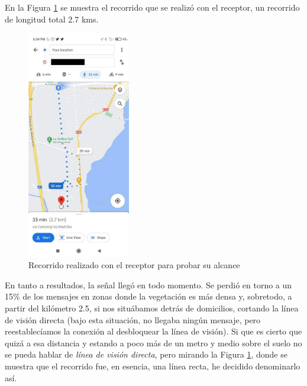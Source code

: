 \documentclass[12pt]{article}
\begin{document}
	\pagebreak
	
	\noindent En la Figura \ref{prueba 1 captura alcance} se muestra el recorrido que se realizó con el receptor, un recorrido de longitud total 2.7 kms. 
	
	
	\begin{figure}[h!]
		\begin{center}
			\includegraphics[width=0.4\textwidth]{img/prueba_1.jpg}
			\caption{Recorrido realizado con el receptor para probar su alcance}
			\label{prueba 1 captura alcance}
		\end{center}
	\end{figure}
	
	
	\noindent En tanto a resultados, la señal llegó en todo momento. Se perdió en torno a un 15\% de los mensajes en zonas donde la vegetación es más densa y, sobretodo, a partir del kilómetro 2.5, si nos situábamos detrás de domicilios, cortando la línea de visión directa (bajo esta situación, no llegaba ningún mensaje, pero reestablecíamos la conexión al desbloquear la línea de visión). Si que es cierto que quizá a esa distancia y estando a poco más de un metro y medio sobre el suelo no se pueda hablar de \textit{línea de visión directa}, pero mirando la Figura \ref{prueba 1 captura alcance}, donde se muestra que el recorrido fue, en esencia, una línea recta, he decidido denominarlo así.\\
	
\end{document}
